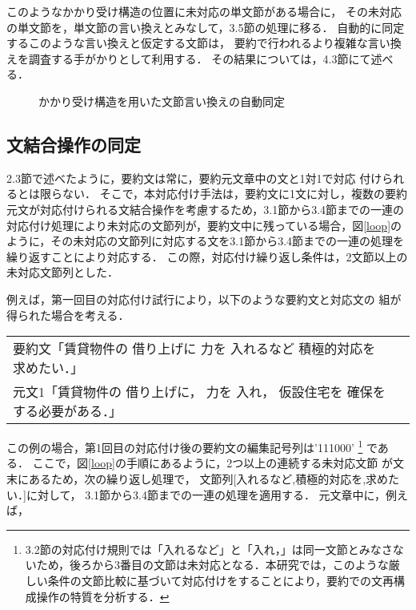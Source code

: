 このようなかかり受け構造の位置に未対応の単文節がある場合に，
その未対応の単文節を，単文節の言い換えとみなして，3.5節の処理に移る．
自動的に同定するこのような言い換えと仮定する文節は，
要約で行われるより複雑な言い換えを調査する手がかりとして利用する．
その結果については，4.3節にて述べる．

\begin{figure}[htbp]
\begin{center}
\caption{かかり受け構造を用いた文節言い換えの自動同定}
\label{complete}
\end{center}
\end{figure}

\subsection{文結合操作の同定}

2.3節で述べたように，要約文は常に，要約元文章中の文と1対1で対応
付けられるとは限らない．
そこで，本対応付け手法は，要約文に1文に対し，複数の要約元文が対応付けられる文結合操作を考慮するため，3.1節から3.4節までの一連の対応付け処理により未対応の文節列が，要約文中に残っている場合，図\ref{loop}のように，その未対応の文節列に対応する文を3.1節から3.4節までの一連の処理を繰り返すことにより対応する．
この際，対応付け繰り返し条件は，2文節以上の未対応文節列とした．

例えば，第一回目の対応付け試行により，以下のような要約文と対応文の
組が得られた場合を考える．

\begin{center}
\small
\begin{tabular}{lp{}}
要約文「賃貸物件の 借り上げに 力を 入れるなど 積極的対応を 求めたい．」\\ 
元文1「賃貸物件の 借り上げに， 力を 入れ， 仮設住宅を  確保を する必要がある．」\\
\end{tabular}
\end{center}

この例の場合，第1回目の対応付け後の要約文の編集記号列は'111000'
\footnote{3.2節の対応付け規則では「入れるなど」と「入れ，」は同一文節とみなさないため，後ろから3番目の文節は未対応となる．本研究では，このような厳しい条件の文節比較に基づいて対応付けをすることにより，要約での文再構成操作の特質を分析する．}
である．
ここで，図\ref{loop}の手順にあるように，2つ以上の連続する未対応文節
が文末にあるため，次の繰り返し処理で，
文節列[入れるなど,積極的対応を,求めたい．]に対して，
3.1節から3.4節までの一連の処理を適用する．
元文章中に，例えば，

